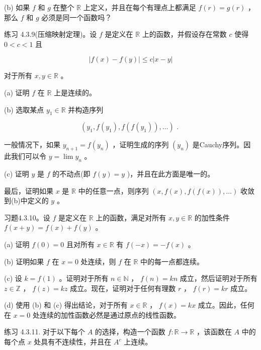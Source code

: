 (b) 如果 \(f\) 和 \(g\) 在整个 \(\mathbb{R}\) 上定义，并且在每个有理点上都满足 \(f\left( r\right)  = g\left( r\right)\) ，那么 \(f\) 和 \(g\) 必须是同一个函数吗？

练习 4.3.9(压缩映射定理)。设 \(f\) 是定义在 \(\mathbb{R}\) 上的函数，并假设存在常数 \(c\) 使得 \(0 < c < 1\) 且

\[
\left| {f\left( x\right)  - f\left( y\right) }\right|  \leq  c\left| {x - y}\right|
\]

对于所有 \(x,y \in  \mathbb{R}\) 。

(a) 证明 \(f\) 在 \(\mathbb{R}\) 上是连续的。

(b) 选取某点 \({y}_{1} \in  \mathbb{R}\) 并构造序列

\[
\left( {{y}_{1},f\left( {y}_{1}\right) ,f\left( {f\left( {y}_{1}\right) }\right) ,\ldots }\right) \text{ . }
\]

一般情况下，如果 \({y}_{n + 1} = f\left( {y}_{n}\right)\) ，证明生成的序列 \(\left( {y}_{n}\right)\) 是Cauchy序列。因此我们可以令 \(y = \lim {y}_{n}\) 。

(c) 证明 \(y\) 是 \(f\) 的不动点(即 \(f\left( y\right)  = y\) )，并且在此方面是唯一的。

最后，证明如果 \(x\) 是 \(\mathbb{R}\) 中的任意一点，则序列 \(\left( {x,f\left( x\right) ,f\left( {f\left( x\right) }\right) ,\ldots }\right)\) 收敛到(b)中定义的 \(y\) 。

习题4.3.10。设 \(f\) 是定义在 \(\mathbb{R}\) 上的函数，满足对所有 \(x,y \in  \mathbb{R}\) 的加性条件 \(f\left( {x + y}\right)  = f\left( x\right)  + f\left( y\right)\) 。

(a) 证明 \(f\left( 0\right)  = 0\) 且对所有 \(x \in  \mathbb{R}\) 有 \(f\left( {-x}\right)  =  - f\left( x\right)\) 。

(b) 证明如果 \(f\) 在 \(x = 0\) 处连续，则 \(f\) 在 \(\mathbb{R}\) 中的每一点都连续。

(c) 设 \(k = f\left( 1\right)\) 。证明对于所有 \(n \in  \mathbb{N}\) ， \(f\left( n\right)  = {kn}\) 成立，然后证明对于所有 \(z \in  \mathbb{Z}\) ， \(f\left( z\right)  = {kz}\) 成立。现在，证明对于任何有理数 \(r\) ， \(f\left( r\right)  = {kr}\) 成立。

(d) 使用 (b) 和 (c) 得出结论，对于所有 \(x \in  \mathbb{R}\) ， \(f\left( x\right)  = {kx}\) 成立。因此，任何在 \(x = 0\) 处连续的加性函数必然是通过原点的线性函数。

练习 4.3.11. 对于以下每个 \(A\) 的选择，构造一个函数 \(f : \mathbb{R} \rightarrow  \mathbb{R}\) ，该函数在 \(A\) 中的每个点 \(x\) 处具有不连续性，并且在 \({A}^{c}\) 上连续。

